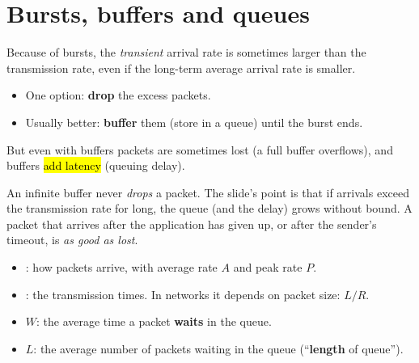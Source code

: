 
\section{Bursts, buffers and queues}


\begin{intuition}
Because of bursts, the \emph{transient} arrival rate is sometimes larger than the transmission rate, even if the long-term average arrival rate is smaller.
\begin{itemize}
  \item One option: \textbf{drop} the excess packets.
  \item Usually better: \textbf{buffer} them (store in a queue) until the burst ends.
\end{itemize}
But even with buffers packets are sometimes lost (a full buffer overflows), and buffers \hl{add latency} (queuing delay).
\end{intuition}

\begin{pitfall}
An infinite buffer never \emph{drops} a packet. The slide's point is that if arrivals exceed the transmission rate for long, the queue (and the delay)
grows without bound. A packet that arrives after the application has given up, or after the sender's timeout, is \emph{as good as lost}.
\end{pitfall}

\begin{defn}
\begin{itemize}
  \item {}: how packets arrive, with average rate $A$ and peak rate $P$.
  \item {}: the transmission times. In networks it depends on packet size: $L/R$.
  \item $W$: the average time a packet \textbf{waits} in the queue.
  \item $L$: the average number of packets waiting in the queue (``\textbf{length} of queue'').
\end{itemize}
\end{defn}


